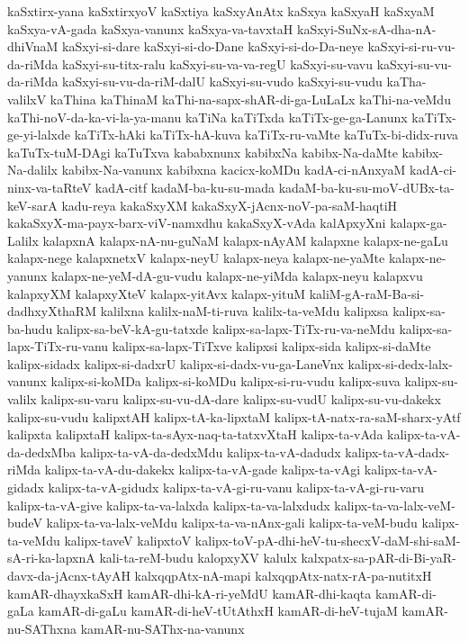 {kaSxtirx-yana
kaSxtirxyoV
kaSxtiya
kaSxyAnAtx
kaSxya
kaSxyaH
kaSxyaM
kaSxya-vA-gada
kaSxya-vanunx
kaSxya-va-tavxtaH
kaSxyi-SuNx-sA-dha-nA-dhiVnaM
kaSxyi-si-dare
kaSxyi-si-do-Dane
kaSxyi-si-do-Da-neye
kaSxyi-si-ru-vu-da-riMda
kaSxyi-su-titx-ralu
kaSxyi-su-va-va-regU
kaSxyi-su-vavu
kaSxyi-su-vu-da-riMda
kaSxyi-su-vu-da-riM-dalU
kaSxyi-su-vudo
kaSxyi-su-vudu
kaTha-valilxV
kaThina
kaThinaM
kaThi-na-sapx-shAR-di-ga-LuLaLx
kaThi-na-veMdu
kaThi-noV-da-ka-vi-la-ya-manu
kaTiNa
kaTiTxda
kaTiTx-ge-ga-Lanunx
kaTiTx-ge-yi-lalxde
kaTiTx-hAki
kaTiTx-hA-kuva
kaTiTx-ru-vaMte
kaTuTx-bi-didx-ruva
kaTuTx-tuM-DAgi
kaTuTxva
kababxnunx
kabibxNa
kabibx-Na-daMte
kabibx-Na-dalilx
kabibx-Na-vanunx
kabibxna
kacicx-koMDu
kadA-ci-nAnxyaM
kadA-ci-ninx-va-taRteV
kadA-citf
kadaM-ba-ku-su-mada
kadaM-ba-ku-su-moV-dUBx-ta-keV-sarA
kadu-reya
kakaSxyXM
kakaSxyX-jAcnx-noV-pa-saM-haqtiH
kakaSxyX-ma-payx-barx-viV-namxdhu
kakaSxyX-vAda
kalApxyXni
kalapx-ga-Lalilx
kalapxnA
kalapx-nA-nu-guNaM
kalapx-nAyAM
kalapxne
kalapx-ne-gaLu
kalapx-nege
kalapxnetxV
kalapx-neyU
kalapx-neya
kalapx-ne-yaMte
kalapx-ne-yanunx
kalapx-ne-yeM-dA-gu-vudu
kalapx-ne-yiMda
kalapx-neyu
kalapxvu
kalapxyXM
kalapxyXteV
kalapx-yitAvx
kalapx-yituM
kaliM-gA-raM-Ba-si-dadhxyXthaRM
kalilxna
kalilx-naM-ti-ruva
kalilx-ta-veMdu
kalipxsa
kalipx-sa-ba-hudu
kalipx-sa-beV-kA-gu-tatxde
kalipx-sa-lapx-TiTx-ru-va-neMdu
kalipx-sa-lapx-TiTx-ru-vanu
kalipx-sa-lapx-TiTxve
kalipxsi
kalipx-sida
kalipx-si-daMte
kalipx-sidadx
kalipx-si-dadxrU
kalipx-si-dadx-vu-ga-LaneVnx
kalipx-si-dedx-lalx-vanunx
kalipx-si-koMDa
kalipx-si-koMDu
kalipx-si-ru-vudu
kalipx-suva
kalipx-su-valilx
kalipx-su-varu
kalipx-su-vu-dA-dare
kalipx-su-vudU
kalipx-su-vu-dakekx
kalipx-su-vudu
kalipxtAH
kalipx-tA-ka-lipxtaM
kalipx-tA-natx-ra-saM-sharx-yAtf
kalipxta
kalipxtaH
kalipx-ta-sAyx-naq-ta-tatxvXtaH
kalipx-ta-vAda
kalipx-ta-vA-da-dedxMba
kalipx-ta-vA-da-dedxMdu
kalipx-ta-vA-dadudx
kalipx-ta-vA-dadx-riMda
kalipx-ta-vA-du-dakekx
kalipx-ta-vA-gade
kalipx-ta-vAgi
kalipx-ta-vA-gidadx
kalipx-ta-vA-gidudx
kalipx-ta-vA-gi-ru-vanu
kalipx-ta-vA-gi-ru-varu
kalipx-ta-vA-give
kalipx-ta-va-lalxda
kalipx-ta-va-lalxdudx
kalipx-ta-va-lalx-veM-budeV
kalipx-ta-va-lalx-veMdu
kalipx-ta-va-nAnx-gali
kalipx-ta-veM-budu
kalipx-ta-veMdu
kalipx-taveV
kalipxtoV
kalipx-toV-pA-dhi-heV-tu-shecxV-daM-shi-saM-sA-ri-ka-lapxnA
kali-ta-reM-budu
kalopxyXV
kalulx
kalxpatx-sa-pAR-di-Bi-yaR-davx-da-jAcnx-tAyAH
kalxqqpAtx-nA-mapi
kalxqqpAtx-natx-rA-pa-nutitxH
kamAR-dhayxkaSxH
kamAR-dhi-kA-ri-yeMdU
kamAR-dhi-kaqta
kamAR-di-gaLa
kamAR-di-gaLu
kamAR-di-heV-tUtAthxH
kamAR-di-heV-tujaM
kamAR-nu-SAThxna
kamAR-nu-SAThx-na-vanunx
}
